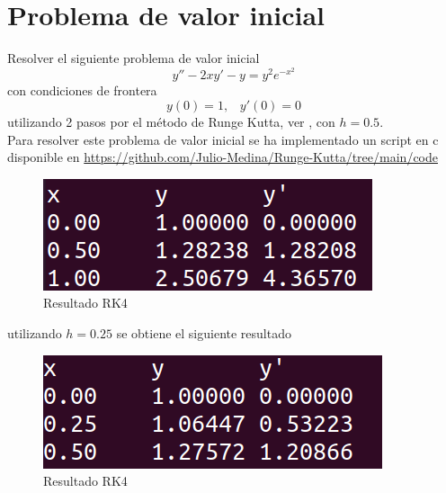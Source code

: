 \documentclass[a4paper]{article}
\begin{document}
\section{Problema de valor inicial}
Resolver el siguiente problema de valor inicial
\begin{equation}
y''-2xy'-y=y^2 e^{-x^2}
\end{equation}
con condiciones de frontera
\begin{equation*}
y(0)=1,\,\,\,\,\,y'(0)=0
\end{equation*}
utilizando 2 pasos por el método de Runge Kutta, ver \cite{Burden}, con $h=0.5$.\\
Para resolver este problema de valor inicial se ha implementado un script en c disponible en \url{https://github.com/Julio-Medina/Runge-Kutta/tree/main/code}
\begin{figure}[h]
\begin{center}
\includegraphics[scale=0.4]{./rkh05.png} 
\end{center} 
\caption{Resultado RK4}
\label{plot}
\end{figure}
utilizando $h=0.25$ se obtiene el siguiente resultado
\begin{figure}[h]
\begin{center}
\includegraphics[scale=0.4]{./rkh025.png} 
\end{center} 
\caption{Resultado RK4}
\label{plot}
\end{figure}
\end{document}
